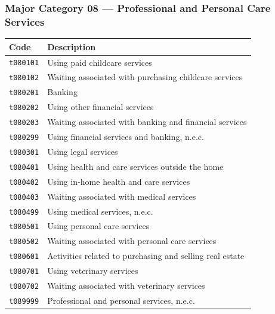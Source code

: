 \documentclass[11pt, a4paper]{article}
\begin{document}
\subsubsection*{Major Category 08 --- Professional and Personal Care Services}
\begin{longtable}{L{3cm} L{13cm}}
\toprule \textbf{Code} & \textbf{Description} \\ \midrule \endhead
\bottomrule \endfoot
\texttt{t080101} & Using paid childcare services \\
 \texttt{t080102} & Waiting associated with purchasing childcare services \\
\texttt{t080201} & Banking \\
 \texttt{t080202} & Using other financial services \\
\texttt{t080203} & Waiting associated with banking and financial services \\
 \texttt{t080299} & Using financial services and banking, n.e.c. \\
\texttt{t080301} & Using legal services \\
 \texttt{t080401} & Using health and care services outside the home \\
\texttt{t080402} & Using in-home health and care services \\
 \texttt{t080403} & Waiting associated with medical services \\
\texttt{t080499} & Using medical services, n.e.c. \\
 \texttt{t080501} & Using personal care services \\
\texttt{t080502} & Waiting associated with personal care services \\
 \texttt{t080601} & Activities related to purchasing and selling real estate \\
\texttt{t080701} & Using veterinary services \\
 \texttt{t080702} & Waiting associated with veterinary services \\
\texttt{t089999} & Professional and personal services, n.e.c. \\
\end{longtable}
\end{document}

